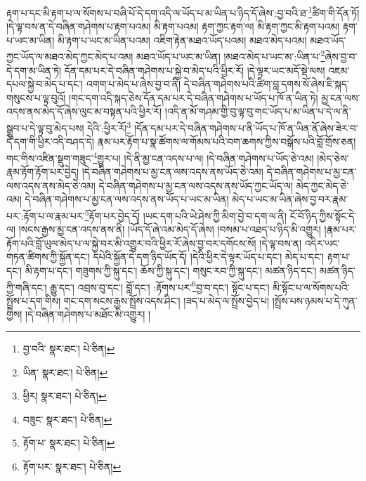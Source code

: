 རྟག་པ་དང་མི་རྟག་པ་ལ་སོགས་པ་བཞི་པོ་དེ་དག་འདི་ལ་ཡོད་པ་མ་ཡིན་པ་ཉིད་དོ་ཞེས་:བྱ་བའི་ཐ་\footnote{བྱ་བའི་  སྣར་ཐང་།  པེ་ཅིན། }ཚིག་གི་དོན་ཏོ། །དེ་ལྟ་བས་ན་དེ་བཞིན་གཤེགས་པ་རྟག་པའམ། མི་རྟག་པའམ། རྟག་ཀྱང་རྟག་ལ། མི་རྟག་ཀྱང་མི་རྟག་པའམ། རྟག་པ་ཡང་མ་ཡིན། མི་རྟག་པ་ཡང་མ་ཡིན་པའམ། འཇིག་རྟེན་མཐའ་ཡོད་པའམ། མཐའ་མེད་པའམ། མཐའ་ཡོད་ཀྱང་ཡོད་ལ་མཐའ་མེད་ཀྱང་མེད་པ་འམ། མཐའ་ཡོད་པ་ཡང་མ་ཡིན། །མཐའ་མེད་པ་ཡང་མ་:ཡིན་པ་\footnote{ཡིན་  སྣར་ཐང་།  པེ་ཅིན། }ཞེས་བྱ་བ་དེ་དག་མ་ཡིན་ཏེ། དོན་དམ་པར་དེ་བཞིན་གཤེགས་པ་སྐྱེ་བ་མེད་པའི་ཕྱིར་རོ། །དེ་ལྟར་ཡང་མདོ་སྡེ་ལས། འཇམ་དཔལ་སྐྱེ་བ་མེད་པ་དང་། འགག་པ་མེད་པ་ཞེས་བྱ་བ་ནི། དེ་བཞིན་གཤེགས་པའི་ཚིག་བླ་དགས་སོ་ཞེས་ཇི་སྐད་གསུངས་པ་ལྟ་བུའོ། །གང་དག་འདི་སྐད་ཅེས་དོན་དམ་པར་དེ་བཞིན་གཤེགས་པ་ཡོད་པ་ཁོ་ན་ཡིན་ཏེ། མྱ་ངན་ལས་འདས་ནས་མེད་དོ་ཞེས་ལུང་མ་བསྟན་པའི་ཕྱིར་རོ། །འདི་ན་མོ་གཤམ་གྱི་བུ་ལྟ་བུ་གང་ཡོད་པ་མ་ཡིན་པ་དེ་ལ་ནི་སྒྲུབ་པ་དེ་ལྟ་བུ་མེད་པས། དེའི་:ཕྱིར་རོ།\footnote{ཕྱིར།  སྣར་ཐང་།  པེ་ཅིན། } །དོན་དམ་པར་དེ་བཞིན་གཤེགས་པ་ནི་ཡོད་པ་ཁོ་ན་ཡིན་ནོ་ཞེས་ཟེར་བ་དེ་དག་གི་ཕྱིར་འདི་བཤད་དེ། རྣམ་པར་རྟོག་པ་སྣ་ཚོགས་ལ་གོམས་པའི་བག་ཆགས་ཀྱིས་བསྒོས་པའི་བློ་གྲོས་ཅན། གང་གིས་འཛིན་སྡུག་གཟུང་\footnote{བཟུང་  སྣར་ཐང་།  པེ་ཅིན། }གྱུར་པ། །དེ་ནི་མྱ་ངན་འདས་པ་ལ། །དེ་བཞིན་གཤེགས་པ་ཡོད་ཅེ་འམ། །མེད་ཅེས་རྣམ་རྟོག་རྟོག་པར་བྱེད། །དེ་བཞིན་གཤེགས་པ་མྱ་ངན་ལས་འདས་ནས་ཡོད་ཅེ་འམ། དེ་བཞིན་གཤེགས་པ་མྱ་ངན་ལས་འདས་ནས་མེད་ཅེ་འམ། དེ་བཞིན་གཤེགས་པ་མྱ་ངན་ལས་འདས་ནས་ཡོད་ཀྱང་ཡོད་ལ། མེད་ཀྱང་མེད་ཅེ་འམ། དེ་བཞིན་གཤེགས་པ་མྱ་ངན་ལས་འདས་ནས་ཡོད་པ་ཡང་མ་ཡིན། མེད་པ་ཡང་མ་ཡིན་ཞེས་བྱ་བར་རྣམ་པར་:རྟོག་པ་ལ་རྣམ་པར་\footnote{རྟོག་པ་  སྣར་ཐང་།  པེ་ཅིན། }རྟོག་པར་བྱེད་དོ། །ཡང་དག་པའི་ཡེ་ཤེས་ཀྱི་མིག་བྱེ་བ་དག་ལ་ནི། ངོ་བོ་ཉིད་ཀྱིས་སྟོང་དེ་ལ། །སངས་རྒྱས་མྱ་ངན་འདས་ནས་ནི། །ཡོད་དོ་ཞེ་འམ་མེད་དོ་ཞེས། །བསམ་པ་འཐད་པ་ཉིད་མི་འགྱུར། །རྣམ་པར་རྟོག་པའི་བློ་ཡུལ་མེད་པ་ལ་སྐྱེ་བར་མི་འགྱུར་བའི་ཕྱིར་རོ་ཞེས་བྱ་བར་དགོངས་སོ། །དེ་ལྟ་བས་ན། འདིར་ཡང་གཏན་ཚིགས་ཀྱི་སྐྱོན་དང་། དཔེའི་སྐྱོན་དེ་དག་ཉིད་ཡོད་དོ། །དེའི་ཕྱིར་དེ་ལྟར་ཡོད་པ་དང་། མེད་པ་དང་། རྟག་པ་དང་། མི་རྟག་པ་དང་། གཟུགས་ཀྱི་སྐུ་དང་། ཆོས་ཀྱི་སྐུ་དང་། གསུང་རབ་ཀྱི་སྐུ་དང་། མཚན་ཉིད་དང་། མཚན་ཉིད་ཀྱི་གཞི་དང་། རྒྱུ་དང་། འབྲས་བུ་དང་། བློ་དང་། :རྟོགས་པར་\footnote{རྟོག་པར་  སྣར་ཐང་།  པེ་ཅིན། }བྱ་བ་དང་། སྟོང་པ་དང་། མི་སྟོང་པ་ལ་སོགས་པའི་སྤྲོས་པ་དག་གིས། གང་དག་སངས་རྒྱས་སྤྲོས་འདས་ཤིང་། །ཟད་པ་མེད་ལ་སྤྲོས་བྱེད་པ། །སྤྲོས་པས་ཉམས་པ་དེ་ཀུན་གྱིས། །དེ་བཞིན་གཤེགས་པ་མཐོང་མི་འགྱུར། །
